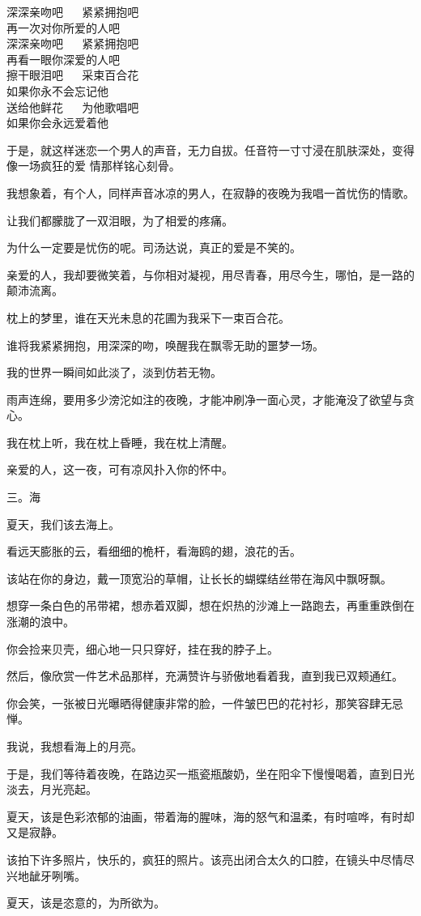 \documentclass[12pt,a4paper]{article}
\def\blankrev{\vspace{1ex}}									%
\newcommand{\subpart}[1]{
	\begingroup \par
	\vspace{1ex} \centering #1
	\par \endgroup \nopagebreak[4]
}
\begin{document}
		\longpoem{}{}{}
		深深亲吻吧 ~~ 紧紧拥抱吧 \\
		再一次对你所爱的人吧 \\
		深深亲吻吧 ~~ 紧紧拥抱吧 \\
		再看一眼你深爱的人吧 \\
		擦干眼泪吧  ~~ 采束百合花 \\
		如果你永不会忘记他 \\
		送给他鲜花 ~~ 为他歌唱吧 \\
		如果你会永远爱着他
		\endlongpoem

		于是，就这样迷恋一个男人的声音，无力自拔。任音符一寸寸浸在肌肤深处，变得像一场疯狂的爱
	情那样铭心刻骨。

		我想象着，有个人，同样声音冰凉的男人，在寂静的夜晚为我唱一首忧伤的情歌。\par
		让我们都朦胧了一双泪眼，为了相爱的疼痛。\par
		为什么一定要是忧伤的呢。司汤达说，真正的爱是不笑的。\par
		亲爱的人，我却要微笑着，与你相对凝视，用尽青春，用尽今生，哪怕，是一路的颠沛流离。\par
		枕上的梦里，谁在天光未息的花圃为我采下一束百合花。\par
		谁将我紧紧拥抱，用深深的吻，唤醒我在飘零无助的噩梦一场。\par
		我的世界一瞬间如此淡了，淡到仿若无物。\par
		雨声连绵，要用多少滂沱如注的夜晚，才能冲刷净一面心灵，才能淹没了欲望与贪心。\par
		我在枕上听，我在枕上昏睡，我在枕上清醒。

		\blankrev
		亲爱的人，这一夜，可有凉风扑入你的怀中。


		\subpart{三。海}

		夏天，我们该去海上。

		\blankrev
		看远天膨胀的云，看细细的桅杆，看海鸥的翅，浪花的舌。\par
		该站在你的身边，戴一顶宽沿的草帽，让长长的蝴蝶结丝带在海风中飘呀飘。\par
		想穿一条白色的吊带裙，想赤着双脚，想在炽热的沙滩上一路跑去，再重重跌倒在涨潮的浪中。

		\blankrev
		你会捡来贝壳，细心地一只只穿好，挂在我的脖子上。\par
		然后，像欣赏一件艺术品那样，充满赞许与骄傲地看着我，直到我已双颊通红。\par
		你会笑，一张被日光曝晒得健康非常的脸，一件皱巴巴的花衬衫，那笑容肆无忌惮。\par
		我说，我想看海上的月亮。\par
		于是，我们等待着夜晚，在路边买一瓶瓷瓶酸奶，坐在阳伞下慢慢喝着，直到日光淡去，月光亮起。\par
		夏天，该是色彩浓郁的油画，带着海的腥味，海的怒气和温柔，有时喧哗，有时却又是寂静。\par
		该拍下许多照片，快乐的，疯狂的照片。该亮出闭合太久的口腔，在镜头中尽情尽兴地龇牙咧嘴。\par
		夏天，该是恣意的，为所欲为。
\end{document}
